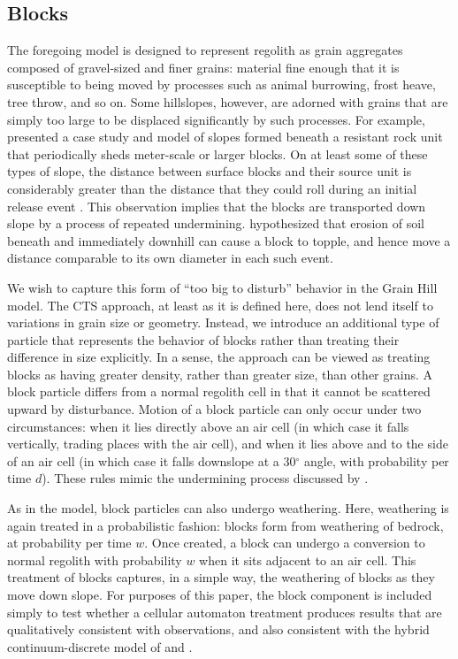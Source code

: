 \documentclass[esurf, manuscript]{copernicus}
\begin{document}
\subsection{Blocks}
\label{blockmethods}

The foregoing model is designed to represent regolith as grain aggregates composed of gravel-sized and finer grains: material fine enough that it is susceptible to being moved by processes such as animal burrowing, frost heave, tree throw, and so on. Some hillslopes, however, are adorned with grains that are simply too large to be displaced significantly by such processes. For example, \citet{glade2017block} presented a case study and model of slopes formed beneath a resistant rock unit that periodically sheds meter-scale or larger blocks. On at least some of these types of slope, the distance between surface blocks and their source unit is considerably greater than the distance that they could roll during an initial release event \citep{duszynski2015boulder}. This observation implies that the blocks are transported down slope by a process of repeated undermining. \citet{glade2017block} hypothesized that erosion of soil beneath and immediately downhill can cause a block to topple, and hence move a distance comparable to its own diameter in each such event.

We wish to capture this form of ``too big to disturb'' behavior in the Grain Hill model. The CTS approach, at least as it is defined here, does not lend itself to variations in grain size or geometry. Instead, we introduce an additional type of particle that represents the behavior of blocks rather than treating their difference in size explicitly. In a sense, the approach can be viewed as treating blocks as having greater density, rather than greater size, than other grains. A block particle differs from a normal regolith cell in that it cannot be scattered upward by disturbance. Motion of a block particle can only occur under two circumstances: when it lies directly above an air cell (in which case it falls vertically, trading places with the air cell), and when it lies above and to the side of an air cell (in which case it falls downslope at a 30$^\circ$ angle, with probability per time $d$). These rules mimic the undermining process discussed by \citet{glade2017block}.

As in the \citet{glade2017block} model, block particles can also undergo weathering. Here, weathering is again treated in a probabilistic fashion: blocks form from weathering of bedrock, at probability per time $w$. Once created, a block can undergo a conversion to normal regolith with probability $w$ when it sits adjacent to an air cell. This treatment of blocks captures, in a simple way, the weathering of blocks as they move down slope. For purposes of this paper, the block component is included simply to test whether a cellular automaton treatment produces results that are qualitatively consistent with observations, and also consistent with the hybrid continuum-discrete model of \citet{glade2017block} and \citet{glade2017quasi}.
\end{document}
